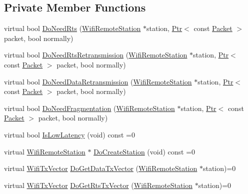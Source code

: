 \subsection*{Private Member Functions}
\begin{DoxyCompactItemize}
\item 
virtual bool \hyperlink{classns3_1_1WifiRemoteStationManager_a801d336a9e8666df323cf4ea13055001}{Do\+Need\+Rts} (\hyperlink{structns3_1_1WifiRemoteStation}{Wifi\+Remote\+Station} $\ast$station, \hyperlink{classns3_1_1Ptr}{Ptr}$<$ const \hyperlink{classns3_1_1Packet}{Packet} $>$ packet, bool normally)
\item 
virtual bool \hyperlink{classns3_1_1WifiRemoteStationManager_aa61a3e763718f9e2c7b405b15eb918d9}{Do\+Need\+Rts\+Retransmission} (\hyperlink{structns3_1_1WifiRemoteStation}{Wifi\+Remote\+Station} $\ast$station, \hyperlink{classns3_1_1Ptr}{Ptr}$<$ const \hyperlink{classns3_1_1Packet}{Packet} $>$ packet, bool normally)
\item 
virtual bool \hyperlink{classns3_1_1WifiRemoteStationManager_aaee2475c272acbdf7a1b2432fca4a5e4}{Do\+Need\+Data\+Retransmission} (\hyperlink{structns3_1_1WifiRemoteStation}{Wifi\+Remote\+Station} $\ast$station, \hyperlink{classns3_1_1Ptr}{Ptr}$<$ const \hyperlink{classns3_1_1Packet}{Packet} $>$ packet, bool normally)
\item 
virtual bool \hyperlink{classns3_1_1WifiRemoteStationManager_a0f288b85dee59e9c67d223bfa958cca1}{Do\+Need\+Fragmentation} (\hyperlink{structns3_1_1WifiRemoteStation}{Wifi\+Remote\+Station} $\ast$station, \hyperlink{classns3_1_1Ptr}{Ptr}$<$ const \hyperlink{classns3_1_1Packet}{Packet} $>$ packet, bool normally)
\item 
virtual bool \hyperlink{classns3_1_1WifiRemoteStationManager_a3b5ae71dce8e994b493ddfdb1d2f57f6}{Is\+Low\+Latency} (void) const =0
\item 
virtual \hyperlink{structns3_1_1WifiRemoteStation}{Wifi\+Remote\+Station} $\ast$ \hyperlink{classns3_1_1WifiRemoteStationManager_a63dfc98d85d14b9e6b6314c7648c6a7d}{Do\+Create\+Station} (void) const =0
\item 
virtual \hyperlink{classns3_1_1WifiTxVector}{Wifi\+Tx\+Vector} \hyperlink{classns3_1_1WifiRemoteStationManager_a5a6b2bfcd4959da43c54f0072bd01202}{Do\+Get\+Data\+Tx\+Vector} (\hyperlink{structns3_1_1WifiRemoteStation}{Wifi\+Remote\+Station} $\ast$station)=0
\item 
virtual \hyperlink{classns3_1_1WifiTxVector}{Wifi\+Tx\+Vector} \hyperlink{classns3_1_1WifiRemoteStationManager_abf44eccb31d4b1b58644fd6721d132c9}{Do\+Get\+Rts\+Tx\+Vector} (\hyperlink{structns3_1_1WifiRemoteStation}{Wifi\+Remote\+Station} $\ast$station)=0

\end{DoxyCompactItemize}
